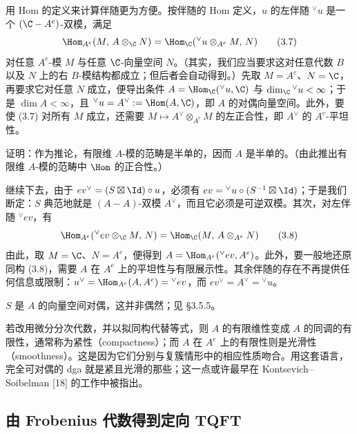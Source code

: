 用 Hom 的定义来计算伴随更为方便。按伴随的 Hom 定义，$u$ 的左伴随 ${}^{\vee}u$ 是一个 $(\C-A^{e})$-双模，满足
\begin{equation}
\Hom_{A^{e}}(M,\,A\otimes_{\C}N)=\Hom_{\C}({}^{\vee}u\otimes_{A^{e}}M,\,N)
\tag{3.7}\label{eq:3.7}
\end{equation}
对任意 $A^{e}$-模 $M$ 与任意 $\C$-向量空间 $N$。（其实，我们应当要求这对任意代数 $B$ 以及 $N$ 上的右 $B$-模结构都成立；但后者会自动得到。）先取 $M=A^{e}$、$N=\C$，再要求它对任意 $N$ 成立，便导出条件 $A=\Hom_{\C}({}^{\vee}u,\C)$ 与 $\dim_{\C}{}^{\vee}u<\infty$；于是 $\dim A<\infty$，且 ${}^{\vee}u=A^{\vee}:=\Hom(A,\C)$，即 $A$ 的对偶向量空间。此外，要使 (3.7) 对所有 $M$ 成立，还需要 $M\mapsto A^{\vee}\otimes_{A^{e}}M$ 的左正合性，即 $A^{\vee}$ 的 $A^{e}$-平坦性。

\begin{exercise}
证明：作为推论，有限维 $A$-模的范畴是半单的，因而 $A$ 是半单的。（由此推出有限维 $A$-模的范畴中 $\Hom$ 的正合性。）
\end{exercise}

继续下去，由于 $ev^{\vee}=(S\boxtimes\Id)\circ u$，必须有 $ev={}^{\vee}u\circ(S^{-1}\boxtimes\Id)$；于是我们断定：$S$ 典范地就是 $(A-A)$-双模 $A^{\vee}$，而且它必须是可逆双模。其次，对左伴随 ${}^{\vee}ev$，有
\begin{equation}
\Hom_{A^{e}}({}^{\vee}ev\otimes_{\C}M,\,N)=\Hom_{\C}(M,\,A\otimes_{A^{e}}N)
\tag{3.8}\label{eq:3.8}
\end{equation}
由此，取 $M=\C$、$N=A^{e}$，便得到 $A=\Hom_{A^{e}}({}^{\vee}ev,A^{e})$。此外，要一般地还原同构 (3.8)，需要 $A$ 在 $A^{e}$ 上的平坦性与有限展示性。其余伴随的存在不再提供任何信息或限制：$u^{\vee}=\Hom_{A^{e}}(A,A^{e})={}^{\vee}ev$，而 $ev^{\vee}=A^{\vee}={}^{\vee}u$。

\begin{remark}
$S$ 是 $A$ 的向量空间对偶，这并非偶然；见 §3.5.5。
\end{remark}

若改用微分分次代数，并以拟同构代替等式，则 $A$ 的有限维性变成 $A$ 的同调的有限性，通常称为紧性（compactness）；而 $A$ 在 $A^{e}$ 上的有限性则是光滑性（smoothness）。这是因为它们分别与复簇情形中的相应性质吻合。用这套语言，完全可对偶的 dga 就是紧且光滑的那些；这一点或许最早在 Kontsevich--Soibelman [18] 的工作中被指出。

\subsection{由 Frobenius 代数得到定向 TQFT}

